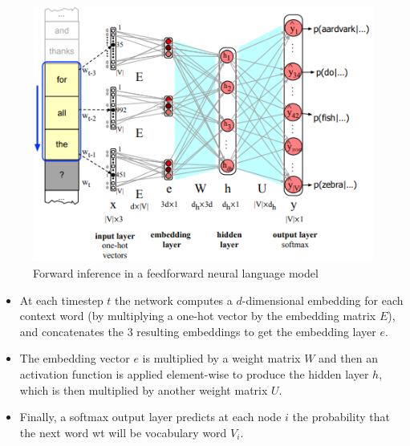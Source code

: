 \begin{table}[H]
    \begin{minipage}{0.55\linewidth}
        \begin{figure}[H]
            \includegraphics[width=\linewidth]{Pictures/nlp/fig-7-17.png}
            \caption{Forward inference in a feedforward neural language model}
        \end{figure}
    \end{minipage}
    \hfill
    \begin{minipage}{0.55\linewidth}
        \begin{itemize}
            \item At each timestep $t$ the network computes a $d$-dimensional embedding for each context word (by multiplying a one-hot vector by the embedding matrix $E$), and concatenates the $3$ resulting embeddings to get the embedding layer $e$.
            
            \item The embedding vector $e$ is multiplied by a weight matrix $W$ and then an activation function is applied element-wise to produce the hidden layer $h$, which is then multiplied by another weight matrix $U$.

            \item Finally, a softmax output layer predicts at each node $i$ the probability that the next word wt will be vocabulary word $V_i$.
        \end{itemize}
    \end{minipage}
\end{table}

